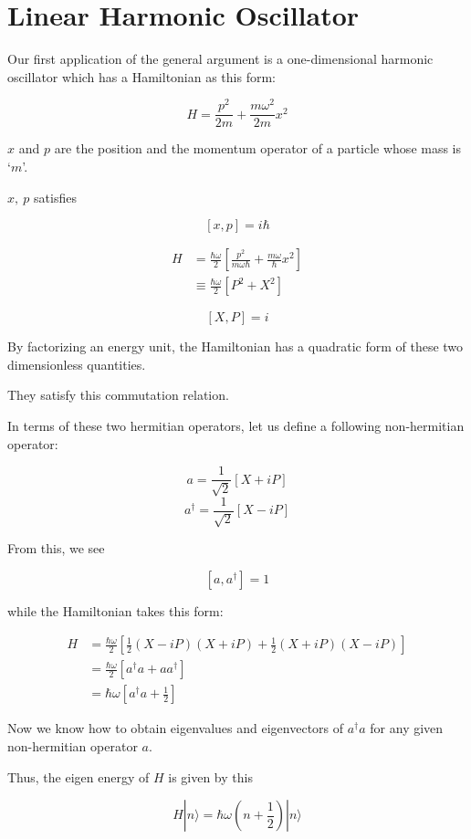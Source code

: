 \section{Linear Harmonic Oscillator}


Our first application of the general argument is a one-dimensional harmonic oscillator which has a Hamiltonian as this form:

\begin{equation}
H = \frac{p^2}{2m}+\frac{m\omega^2}{2m}x^2
\end{equation}

$x$ and $p$ are the position and the momentum operator of a particle whose mass is `$m$'.

$x,\ p$ satisfies

\[[x, p] = i\hbar \]

\[\begin{split}
H &= \frac{\hbar\omega}{2}\left[\frac{p^2}{m\omega\hbar}+\frac{m\omega}{\hbar}x^2\right]\\
&\equiv\frac{\hbar\omega}{2}[P^2+X^2]
\end{split} \]

\[[X, P] = i \]

By factorizing an energy unit, the Hamiltonian has a quadratic form of these two dimensionless quantities. 

They satisfy this commutation relation. 

In terms of these two hermitian operators, let us define a following non-hermitian operator:

\[a = \frac{1}{\sqrt{2}}[X+iP] \]
\[a^\dagger = \frac{1}{\sqrt{2}}[X-iP] \]

From this, we see

\[[a,a^\dagger] = 1 \]

while the Hamiltonian takes this form:

\[\begin{split}
H &= \frac{\hbar\omega}{2}\left[\frac{1}{2}(X-iP)(X+iP)+\frac{1}{2}(X+iP)(X-iP)\right]\\
&=\frac{\hbar\omega}{2}[a^\dagger a+a a^\dagger]\\
&=\hbar\omega\left[a^\dagger a+\frac{1}{2}\right]
\end{split} \]

Now we know how to obtain eigenvalues and eigenvectors of $a^\dagger a$ for any given non-hermitian operator $a$. 

Thus, the eigen energy of $H$ is given by this

\[H|n\rangle = \hbar\omega\left(n+\frac{1}{2}\right)|n\rangle \]

